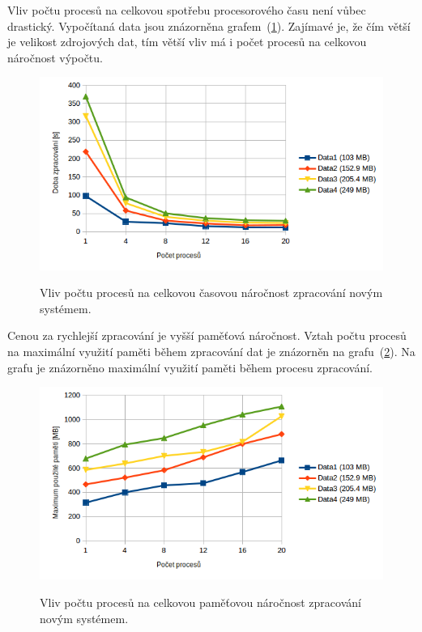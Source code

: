 Vliv počtu procesů na celkovou spotřebu procesorového času není vůbec drastický. Vypočítaná data
jsou znázorněna grafem~(\ref{graph:graph_procesorovy_cas_vertikalizace}). Zajímavé je,
že čím větší je velikost zdrojových dat, tím větší vliv má i počet procesů na
celkovou náročnost výpočtu.

\begin{figure}[H]
    \begin{center}
        \label{graph:graph_procesorovy_cas_vertikalizace}
        \includegraphics[width=1.0\textwidth]{obrazky-figures/graph_realny_cas_vertikalizace.png}
        \caption{Vliv počtu procesů na celkovou časovou náročnost zpracování novým systémem.}
    \end{center}
\end{figure}

Cenou za rychlejší zpracování je vyšší paměťová náročnost. Vztah počtu procesů na maximální
využití paměti během zpracování dat je znázorněn na grafu~(\ref{graph:graph_vertikalizace_pamet}).
Na grafu je znázorněno maximální využití paměti během procesu zpracování.

\begin{figure}[H]
    \begin{center}
        \label{graph:graph_vertikalizace_pamet}
        \includegraphics[width=1.0\textwidth]{obrazky-figures/graph_vertikalizace_pamet.png}
        \caption{Vliv počtu procesů na celkovou paměťovou náročnost zpracování novým systémem.}
    \end{center}
\end{figure}


